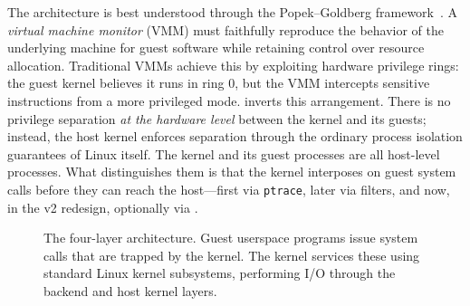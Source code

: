 The architecture is best understood through the Popek--Goldberg
framework~\cite{popek1974}.  A \emph{virtual machine monitor} (VMM)
must faithfully reproduce the behavior of the underlying machine for guest
software while retaining control over resource allocation.  Traditional VMMs
achieve this by exploiting hardware privilege rings: the guest kernel believes
it runs in ring 0, but the VMM intercepts sensitive instructions from a more
privileged mode.  \UML{} inverts this arrangement.  There is no privilege
separation \emph{at the hardware level} between the \UML{} kernel and its
guests; instead, the host kernel enforces separation through the ordinary
process isolation guarantees of Linux itself.  The \UML{} kernel and its guest
processes are all host-level processes.  What distinguishes them is that the
\UML{} kernel interposes on guest system calls before they can reach the
host---first via \texttt{ptrace}, later via \Seccomp{} filters, and now,
in the v2 redesign, optionally via \KVM{}.

\begin{figure}[ht]
\centering
{}
\caption[UML architectural layers]{%
  The four-layer \UML{} architecture.  Guest userspace programs issue system
  calls that are trapped by the \UML{} kernel.  The \UML{} kernel services
  these using standard Linux kernel subsystems, performing I/O through the
  backend and host kernel layers.
}
\label{fig:intro-layers}
\end{figure}



